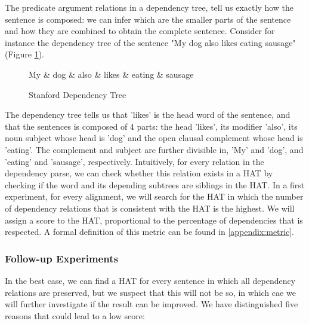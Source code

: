 \documentclass{report}
\theoremstyle{definition}
\theoremstyle{plain}
\begin{document}
The predicate argument relations in a dependency tree, tell us exactly how the sentence is composed: we can infer which are the smaller parts of the sentence and how they are combined to obtain the complete sentence. Consider for instance the dependency tree of the sentence "My dog also likes eating sausage" (Figure \ref{fig:deptree1}).

\begin{figure}[!h]\label{fig:deptree1}
\centering
\begin{dependency}[theme=simple]%
\begin{deptext}[column sep=.5cm, row sep=.1ex]
My \& dog \& also \& likes \& eating \& sausage \\
\end{deptext}
\end{dependency}
\caption{Stanford Dependency Tree}
\end{figure}

The dependency tree tells us that 'likes' is the head word of the sentence, and that the sentences is composed of 4 parts: the head 'likes', its modifier 'also', its noun subject whose head is 'dog' and the open clausal complement whose head is 'eating'. The complement and subject are further divisible in, 'My' and 'dog', and 'eating' and 'sausage', respectively. Intuitively, for every relation in the dependency parse, we can check whether this relation exists in a HAT by checking if the word and its depending subtrees are siblings in the HAT.
In a first experiment, for every alignment, we will search for the HAT in which the number of dependency relations that is consistent with the HAT is the highest. We will assign a score to the HAT, proportional to the percentage of dependencies that is respected. A formal definition of this metric can be found in \ref{appendix:metric}.

\subsubsection{Follow-up Experiments}

In the best case, we can find a HAT for every sentence in which all dependency relations are preserved, but we suspect that this will not be so, in which cae we will further investigate if the result can be improved. We have distinguished five reasons that could lead to a low score:
\end{document}
